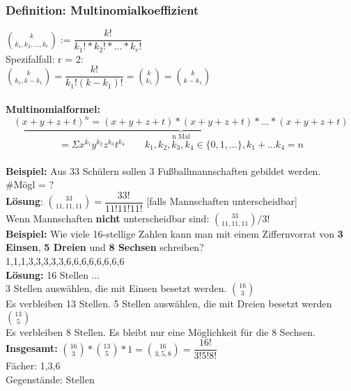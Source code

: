  	\subsubsection{Definition: Multinomialkoeffizient}
 	$\binom{k}{k_1,k_2,...,k_r} := \dfrac{k!}{k_1!*k_2!*...*k_r!}$\medskip\\
 	Spezifalfall: r = 2:\medskip\\
 	$\binom{k}{k_1,k-k_1}=\dfrac{k!}{k_1!(k-k_1)!} = \binom{k}{k_1}= \binom{k}{k-k_1}$\\\\
 	\textbf{Multinomialformel: } $$\underbrace{(x+y+z+t)^n = (x+y+z+t)*(x+y+z+t)*...*(x+y+z+t)}_\text{n Mal}$$ 
 	 $$=\Sigma x^{k_1}y^{k_2}z^{k_3}t^{k_4} \qquad k_1, k_2, k_3, k_4 \in \{0,1,...\}, k_1 + ... k_4 = n$$\medskip\\
 	 \textbf{Beispiel:} Aus 33 Schülern sollen 3 Fußballmannschaften gebildet werden.\\
 	 \#Mögl = ?\medskip\\
 	 \textbf{Lösung}: $\binom{33}{11,11,11}= \dfrac{33!}{11!11!11!}$ [falls Mannschaften unterscheidbar]\medskip\\
 	 Wenn Mannschaften \textbf{nicht} unterscheidbar sind: $\binom{33}{11,11,11}/3!$\bigskip\\
 	 \textbf{Beispiel:} Wie viele 16-stellige Zahlen kann man mit einem Ziffernvorrat von \textbf{3 Einsen}, \textbf{5 Dreien} und \textbf{8 Sechsen} schreiben? \medskip\\
 	 1,1,1,3,3,3,3,3,6,6,6,6,6,6,6,6\medskip\\
 	 \textbf{Lösung:} 16 Stellen \qedsymbol \qedsymbol \qedsymbol ... \qedsymbol\\
 	 3 Stellen auswählen, die mit Einsen besetzt werden. $\binom{16}{3}$\\
 	 Es verbleiben 13 Stellen. 5 Stellen auswählen, die mit Dreien besetzt werden $\binom{13}{5}$\\
 	 Es verbleiben 8 Stellen. Es bleibt nur eine Möglichkeit für die 8 Sechsen.\medskip\\
 	 \textbf{Insgesamt:} $\binom{16}{3}*\binom{13}{5}*1 = \binom{16}{3,5, 8} = \dfrac{16!}{3!5!8!}$\smallskip\\
 	 Fächer: 1,3,6\\
 	 Gegenstände: Stellen

